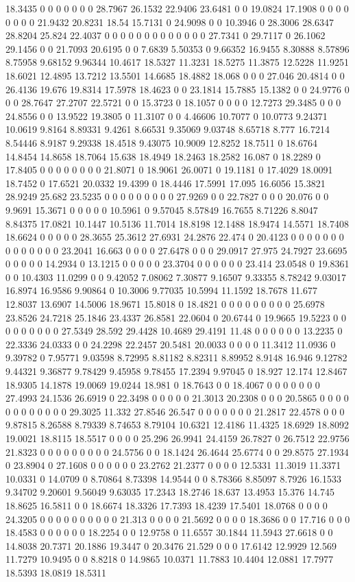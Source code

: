 18.3435 0 0 0 0 0 0 0 28.7967 26.1532 22.9406 23.6481 0 0 19.0824 17.1908 0 0 0 0 0 0 0 0 21.9432 20.8231 18.54 15.7131 0 24.9098 0 0 10.3946 0 28.3006 28.6347 28.8204 25.824 22.4037 0 0 0 0 0 0 0 0 0 0 0 0 0 27.7341 0 29.7117 0 26.1062 29.1456 0 0 21.7093 20.6195 0 0 7.6839 5.50353 0 9.66352 16.9455 8.30888 8.57896 8.75958 9.68152 9.96344 10.4617 18.5327 11.3231 18.5275 11.3875 12.5228 11.9251 18.6021 12.4895 13.7212 13.5501 14.6685 18.4882 18.068 0 0 0 27.046 20.4814 0 0 26.4136 19.676 19.8314 17.5978 18.4623 0 0 23.1814 15.7885 15.1382 0 0 24.9776 0 0 0 28.7647 27.2707 22.5721 0 0 15.3723 0 18.1057 0 0 0 0 12.7273 29.3485 0 0 0 24.8556 0 0 13.9522 19.3805 0 11.3107 0 0 4.46606 10.7077 0 10.0773 9.24371 10.0619 9.8164 8.89331 9.4261 8.66531 9.35069 9.03748 8.65718 8.777 16.7214 8.54446 8.9187 9.29338 18.4518 9.43075 10.9009 12.8252 18.7511 0 18.6764 14.8454 14.8658 18.7064 15.638 18.4949 18.2463 18.2582 16.087 0 18.2289 0 17.8405 0 0 0 0 0 0 0 0 21.8071 0 18.9061 26.0071 0 19.1181 0 17.4029 18.0091 18.7452 0 17.6521 20.0332 19.4399 0 18.4446 17.5991 17.095 16.6056 15.3821 28.9249 25.682 23.5235 0 0 0 0 0 0 0 0 0 27.9269 0 0 22.7827 0 0 0 20.076 0 0 9.9691 15.3671 0 0 0 0 0 10.5961 0 9.57045 8.57849 16.7655 8.71226 8.8047 8.84375 17.0821 10.1447 10.5136 11.7014 18.8198 12.1488 18.9474 14.5571 18.7408 18.6624 0 0 0 0 0 28.3655 25.3612 27.6931 24.2876 22.474 0 20.4123 0 0 0 0 0 0 0 0 0 0 0 0 0 0 23.2041 16.663 0 0 0 0 27.6478 0 0 0 29.0917 27.975 24.7927 23.6695 0 0 0 0 0 14.2934 0 13.1215 0 0 0 0 0 23.3704 0 0 0 0 0 0 23.414 23.0548 0 19.8361 0 0 10.4303 11.0299 0 0 9.42052 7.08062 7.30877 9.16507 9.33355 8.78242 9.03017 16.8974 16.9586 9.90864 0 10.3006 9.77035 10.5994 11.1592 18.7678 11.677 12.8037 13.6907 14.5006 18.9671 15.8018 0 18.4821 0 0 0 0 0 0 0 0 0 25.6978 23.8526 24.7218 25.1846 23.4337 26.8581 22.0604 0 20.6744 0 19.9665 19.5223 0 0 0 0 0 0 0 0 0 27.5349 28.592 29.4428 10.4689 29.4191 11.48 0 0 0 0 0 0 13.2235 0 22.3336 24.0333 0 0 24.2298 22.2457 20.5481 20.0033 0 0 0 0 11.3412 11.0936 0 9.39782 0 7.95771 9.03598 8.72995 8.81182 8.82311 8.89952 8.9148 16.946 9.12782 9.44321 9.36877 9.78429 9.45958 9.78455 17.2394 9.97045 0 18.927 12.174 12.8467 18.9305 14.1878 19.0069 19.0244 18.981 0 18.7643 0 0 18.4067 0 0 0 0 0 0 0 27.4993 24.1536 26.6919 0 22.3498 0 0 0 0 0 21.3013 20.2308 0 0 0 20.5865 0 0 0 0 0 0 0 0 0 0 0 0 29.3025 11.332 27.8546 26.547 0 0 0 0 0 0 0 21.2817 22.4578 0 0 0 9.87815 8.26588 8.79339 8.74653 8.79104 10.6321 12.4186 11.4325 18.6929 18.8092 19.0021 18.8115 18.5517 0 0 0 0 25.296 26.9941 24.4159 26.7827 0 26.7512 22.9756 21.8323 0 0 0 0 0 0 0 0 0 24.5756 0 0 18.1424 26.4644 25.6774 0 0 29.8575 27.1934 0 23.8904 0 27.1608 0 0 0 0 0 0 23.2762 21.2377 0 0 0 0 12.5331 11.3019 11.3371 10.0331 0 14.0709 0 8.70864 8.73398 14.9544 0 0 8.78366 8.85097 8.7926 16.1533 9.34702 9.20601 9.56049 9.63035 17.2343 18.2746 18.637 13.4953 15.376 14.745 18.8625 16.5811 0 0 18.6674 18.3326 17.7393 18.4239 17.5401 18.0768 0 0 0 0 24.3205 0 0 0 0 0 0 0 0 0 0 21.313 0 0 0 0 21.5692 0 0 0 0 18.3686 0 0 17.716 0 0 0 18.4583 0 0 0 0 0 0 18.2254 0 0 12.9758 0 11.6557 30.1844 11.5943 27.6618 0 0 14.8038 20.7371 20.1886 19.3447 0 20.3476 21.529 0 0 0 17.6142 12.9929 12.569 11.7279 10.9495 0 0 8.8218 0 14.9865 10.0371 11.7883 10.4404 12.0881 17.7977 18.5393 18.0819 18.5311 